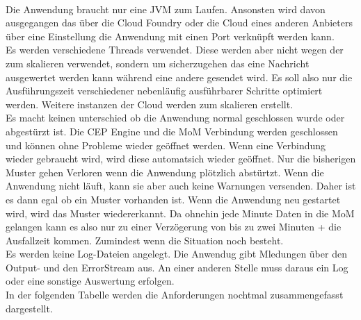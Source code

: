 \\
Die Anwendung braucht nur eine JVM zum Laufen. Ansonsten wird davon ausgegangen das über die Cloud Foundry oder die Cloud eines anderen Anbieters über eine Einstellung die Anwendung mit einen Port verknüpft werden kann. 
\\
Es werden verschiedene Threads verwendet. Diese werden aber nicht wegen der zum skalieren verwendet, sondern um sicherzugehen das eine Nachricht ausgewertet werden kann während eine andere gesendet wird. Es soll also nur die Ausführungszeit verschiedener nebenläufig ausführbarer Schritte optimiert werden. Weitere instanzen der Cloud werden zum skalieren erstellt. 
\\
Es macht keinen unterschied ob die Anwendung normal geschlossen wurde oder abgestürzt ist. Die CEP Engine und die MoM Verbindung werden geschlossen und können ohne Probleme wieder geöffnet werden. Wenn eine Verbindung wieder gebraucht wird, wird diese automatsich wieder geöffnet. Nur die bisherigen Muster gehen Verloren wenn die Anwendung plötzlich abstürtzt. Wenn die Anwendung nicht läuft, kann sie aber auch keine Warnungen versenden. Daher ist es dann egal ob ein Muster vorhanden ist. Wenn die Anwendung neu gestartet wird, wird das Muster wiedererkannt. Da ohnehin jede Minute Daten in die MoM gelangen kann es also nur zu einer Verzögerung von bis zu zwei Minuten + die Ausfallzeit kommen. Zumindest wenn die Situation noch besteht.  
\\
Es werden keine Log-Dateien angelegt. Die Anwendug gibt Mledungen über den Output- und den ErrorStream aus. An einer anderen Stelle muss daraus ein Log oder eine sonstige Auswertung erfolgen. 
\\
In der folgenden Tabelle werden die Anforderungen nochtmal zusammengefasst dargestellt. 
